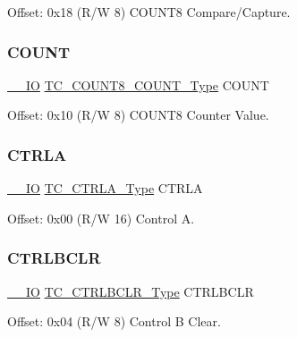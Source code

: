 Offset\+: 0x18 (R/W 8) C\+O\+U\+N\+T8 Compare/\+Capture. 

\mbox{\label{struct_tc_count8_a4013179057c7f588fa06c60887f76125}} 
\subsubsection{\texorpdfstring{COUNT}{COUNT}}
{\footnotesize\ttfamily \mbox{\hyperlink{core__cm0plus_8h_aec43007d9998a0a0e01faede4133d6be}{\+\_\+\+\_\+\+IO}} \mbox{\hyperlink{union_t_c___c_o_u_n_t8___c_o_u_n_t___type}{T\+C\+\_\+\+C\+O\+U\+N\+T8\+\_\+\+C\+O\+U\+N\+T\+\_\+\+Type}} C\+O\+U\+NT}



Offset\+: 0x10 (R/W 8) C\+O\+U\+N\+T8 Counter Value. 

\mbox{\label{struct_tc_count8_a282ae6be6071506774ed492a00c9a7c5}} 
\subsubsection{\texorpdfstring{CTRLA}{CTRLA}}
{\footnotesize\ttfamily \mbox{\hyperlink{core__cm0plus_8h_aec43007d9998a0a0e01faede4133d6be}{\+\_\+\+\_\+\+IO}} \mbox{\hyperlink{union_t_c___c_t_r_l_a___type}{T\+C\+\_\+\+C\+T\+R\+L\+A\+\_\+\+Type}} C\+T\+R\+LA}



Offset\+: 0x00 (R/W 16) Control A. 

\mbox{\label{struct_tc_count8_a5d266ecd4b84c85e2136fcdfcdd1e57f}} 
\subsubsection{\texorpdfstring{CTRLBCLR}{CTRLBCLR}}
{\footnotesize\ttfamily \mbox{\hyperlink{core__cm0plus_8h_aec43007d9998a0a0e01faede4133d6be}{\+\_\+\+\_\+\+IO}} \mbox{\hyperlink{union_t_c___c_t_r_l_b_c_l_r___type}{T\+C\+\_\+\+C\+T\+R\+L\+B\+C\+L\+R\+\_\+\+Type}} C\+T\+R\+L\+B\+C\+LR}



Offset\+: 0x04 (R/W 8) Control B Clear. 

\mbox{\label{struct_tc_count8_aad77cd2b986ac4f6e8112f1d8ef850a5}} 
